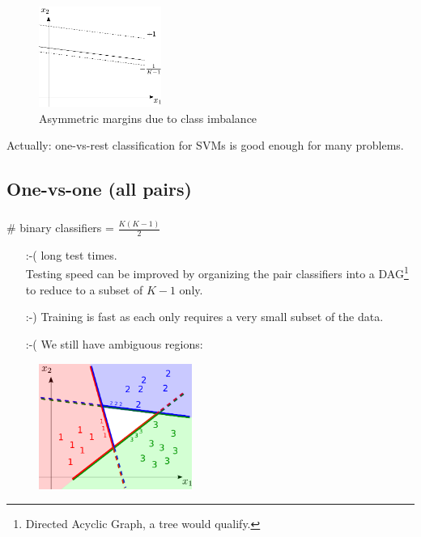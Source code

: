 \begin{frame}

\begin{figure}[h]
     \centering
	 \includegraphics[width=4cm]{img/asymmetric}
     \caption{Asymmetric margins due to class imbalance}
	 \label{fig:imbalance}
\end{figure}

Actually: one-vs-rest classification for SVMs is good enough for many problems.

    
\end{frame}

\subsection{One-vs-one (all pairs)}

\begin{frame}\frametitle{\subsecname}

\# binary classifiers = $\frac{K(K-1)}{2}$ 

\begin{itemize}
\item[:-(] long test times.\\
    Testing speed can be improved by organizing the pair classifiers into a DAG\footnote{Directed Acyclic Graph, a tree would qualify.} to reduce to a subset of $K-1$ only.
\item[:-)] Training is fast as each only requires a very small subset of the data. 
\item[:-(] We still have ambiguous regions:    
\end{itemize}

\begin{figure}[h]
     \centering
	 \includegraphics[width=5cm]{img/3classes_onevsone_majority}
	 \label{fig:onevsone}
\end{figure}
    
\end{frame}

